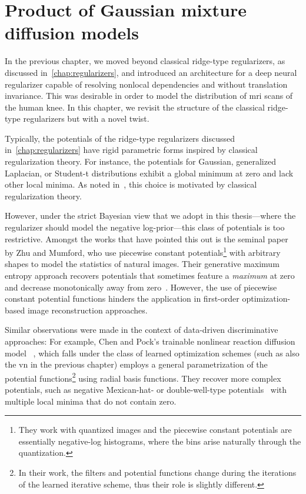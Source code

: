 \chapter{Product of Gaussian mixture diffusion models}%
\label{chap:pogmdm}%
\graphicspath{{chapters/pogmdm/figures}}%
In the previous chapter, we moved beyond classical ridge-type regularizers, as discussed in~\cref{chap:regularizers}, and introduced an architecture for a deep neural regularizer capable of resolving nonlocal dependencies and without translation invariance.
This was desirable in order to model the distribution of \gls{mri} scans of the human knee.
In this chapter, we revisit the structure of the classical ridge-type regularizers but with a novel twist.

Typically, the potentials of the ridge-type regularizers discussed in~\cref{chap:regularizers} have rigid parametric forms inspired by classical regularization theory.
For instance, the potentials for Gaussian, generalized Laplacian, or Student-t distributions exhibit a global minimum at zero and lack other local minima.
As noted in~\cite{zhu_prior_1997}, this choice is motivated by classical regularization theory.

However, under the strict Bayesian view that we adopt in this thesis---where the regularizer should model the negative log-prior---this class of potentials is too restrictive.
Amongst the works that have pointed this out is the seminal paper~\cite{zhu_prior_1997} by Zhu and Mumford, who use piecewise constant potentials\footnote{%
	They work with quantized images and the piecewise constant potentials are essentially negative-log histograms, where the bins arise naturally through the quantization.%
} with arbitrary shapes to model the statistics of natural images.
Their generative maximum entropy approach recovers potentials that sometimes feature a \emph{maximum} at zero and decrease monotonically away from zero~\cite[fig. 9]{zhu_prior_1997}.
However, the use of piecewise constant potential functions hinders the application in first-order optimization-based image reconstruction approaches.

Similar observations were made in the context of data-driven discriminative approaches:
For example, Chen and Pock's trainable nonlinear reaction diffusion model ~\cite{chen_trainable_2017}, which falls under the class of learned optimization schemes (such as also the \gls{vn} in the previous chapter) employs a general parametrization of the potential functions\footnote{%
	In their work, the filters and potential functions change during the iterations of the learned iterative scheme, thus their role is slightly different.
} using radial basis functions.
They recover more complex potentials, such as negative Mexican-hat- or double-well-type potentials~\cite[fig. 5]{chen_trainable_2017} with multiple local minima that do not contain zero.

